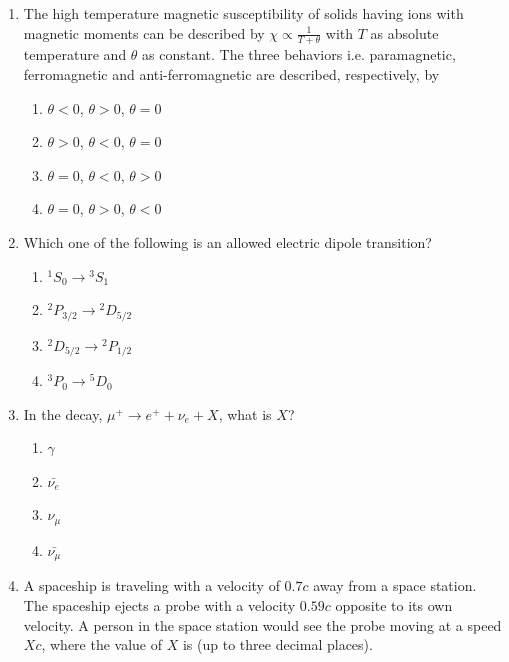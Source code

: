 \documentclass[journal]{IEEEtran}
\numberwithin{equation}{enumi}
\numberwithin{figure}{enumi}
\begin{document}
\begin{enumerate}
\bigskip

\item The high temperature magnetic susceptibility of solids having ions with magnetic moments can be described by $\chi \propto \frac{1}{T + \theta}$ with $T$ as absolute temperature and $\theta$ as constant. The three behaviors i.e. paramagnetic, ferromagnetic and anti-ferromagnetic are described, respectively, by
\begin{multicols}{2}
\begin{enumerate}
    \item $\theta < 0$, $\theta > 0$, $\theta = 0$
    \item $\theta > 0$, $\theta < 0$, $\theta = 0$
    \item $\theta = 0$, $\theta < 0$, $\theta > 0$
    \item $\theta = 0$, $\theta > 0$, $\theta < 0$
\end{enumerate}
\end{multicols}

\bigskip

\item Which one of the following is an allowed electric dipole transition?
\begin{multicols}{2}
\begin{enumerate}
    \item ${}^1 S_0 \rightarrow {}^3 S_1$
    \item ${}^2 P_{3/2} \rightarrow {}^2 D_{5/2}$
    \item ${}^2 D_{5/2} \rightarrow {}^2 P_{1/2}$
    \item ${}^3 P_0 \rightarrow {}^5 D_0$
\end{enumerate}
\end{multicols}

\bigskip

\item In the decay, $\mu^+ \rightarrow e^+ + \nu_e + X$, what is $X$?
\begin{multicols}{2}
\begin{enumerate}
    \item $\gamma$
    \item $\bar{\nu_e}$
    \item $\nu_\mu$
    \item $\bar{\nu_\mu}$
\end{enumerate}
\end{multicols}

\bigskip

\item A spaceship is traveling with a velocity of $0.7 c$ away from a space station. The spaceship ejects a probe with a velocity $0.59 c$ opposite to its own velocity. A person in the space station would see the probe moving at a speed $X c$, where the value of $X$ is \underline{\hspace{2cm}} (up to three decimal places).


\end{enumerate}
\end{document}
